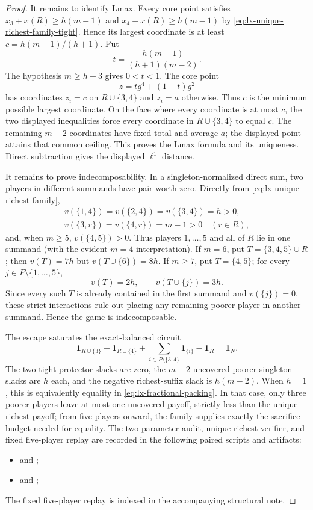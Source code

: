 \begin{proof}
It remains to identify Lmax.  Every core point satisfies
$x_3+x(R)\geq h(m-1)$ and $x_4+x(R)\geq h(m-1)$ by
\eqref{eq:lx-unique-richest-family-tight}.  Hence its largest coordinate is
at least $c=h(m-1)/(h+1)$.  Put
\[
 t=\frac{h(m-1)}{(h+1)(m-2)}.
\]
The hypothesis $m\geq h+3$ gives $0<t<1$.  The core point
\[
 z=t g^4+(1-t)g^2
\]
has coordinates $z_i=c$ on $R\cup\{3,4\}$ and $z_i=a$ otherwise.  Thus $c$ is the
minimum possible largest coordinate.  On the face where every coordinate is
at most $c$, the two displayed inequalities force every coordinate in
$R\cup\{3,4\}$ to equal $c$.  The remaining $m-2$ coordinates have fixed
total and average $a$; the displayed point attains that common ceiling.  This
proves the Lmax formula and its uniqueness.  Direct subtraction gives the
displayed $\ell^1$ distance.

It remains to prove indecomposability.  In a singleton-normalized direct sum,
two players in different summands have pair worth zero.  Directly from
\eqref{eq:lx-unique-richest-family},
\[
\begin{gathered}
v(\{1,4\})=v(\{2,4\})=v(\{3,4\})=h>0,\\
v(\{3,r\})=v(\{4,r\})=m-1>0\quad(r\in R),
\end{gathered}
\]
and, when $m\geq5$, $v(\{4,5\})>0$.  Thus players $1,\ldots,5$ and all of
$R$ lie in one summand (with the evident $m=4$ interpretation).  If $m=6$,
put $T=\{3,4,5\}\cup R$; then $v(T)=7h$ but
$v(T\cup\{6\})=8h$.  If $m\geq7$, put $T=\{4,5\}$; for every
$j\in P\setminus\{1,\ldots,5\}$,
\[
 v(T)=2h,\qquad v(T\cup\{j\})=3h.
\]
Since every such $T$ is already contained in the first summand and
$v(\{j\})=0$, these strict interactions rule out placing any remaining
poorer player in another summand.  Hence the game is indecomposable.

The escape saturates the exact-balanced circuit
\[
 \mathbf1_{R\cup\{3\}}+\mathbf1_{R\cup\{4\}}
 +\sum_{i\in P\setminus\{3,4\}}\mathbf1_{\{i\}}
 -\mathbf1_R=\mathbf1_N.                            \tag{UF-C}
 \label{eq:lx-unique-richest-family-circuit}
\]
The two tight protector slacks are zero, the $m-2$ uncovered poorer singleton
slacks are $h$ each, and the negative richest-suffix slack is $h(m-2)$.
When $h=1$, this is equivalently equality in
\eqref{eq:lx-fractional-packing}.  In that case, only three poorer players
leave at most one uncovered payoff,
strictly less than the unique richest payoff; from five players onward, the
family supplies exactly the sacrifice budget needed for equality.  The
two-parameter audit, unique-richest verifier, and fixed five-player replay are
recorded in the following paired scripts and artifacts:
\begin{itemize}[nosep]
\item {} and
      ;
\item {} and
      ;
\end{itemize}
The fixed five-player replay is indexed in the accompanying structural note.
\end{proof}

